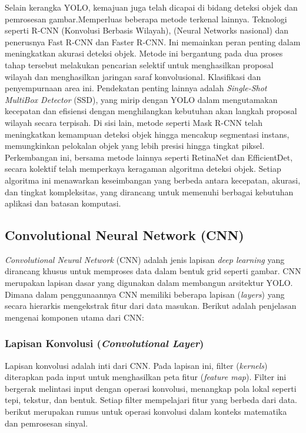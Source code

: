 Selain kerangka YOLO, kemajuan juga telah dicapai di bidang deteksi objek dan pemrosesan gambar.Memperluas beberapa metode terkenal lainnya. Teknologi seperti R-CNN (Konvolusi Berbasis Wilayah), (Neural Networks nasional) dan penerusnya Fast R-CNN dan Faster R-CNN.
Ini memainkan peran penting dalam meningkatkan akurasi deteksi objek. Metode ini bergantung pada dua proses tahap tersebut melakukan pencarian selektif untuk menghasilkan proposal wilayah dan menghasilkan jaringan saraf konvolusional. Klasifikasi dan penyempurnaan area ini. Pendekatan penting lainnya adalah \emph{Single-Shot MultiBox Detector} (SSD), yang mirip dengan YOLO dalam mengutamakan kecepatan dan efisiensi dengan menghilangkan kebutuhan akan langkah proposal wilayah secara terpisah. Di sisi lain, metode seperti Mask R-CNN telah meningkatkan kemampuan deteksi objek hingga mencakup segmentasi instans, memungkinkan pelokalan objek yang lebih presisi hingga tingkat piksel. Perkembangan ini, bersama metode lainnya seperti RetinaNet dan EfficientDet, secara kolektif telah memperkaya keragaman algoritma deteksi objek. Setiap algoritma ini menawarkan keseimbangan yang berbeda antara kecepatan, akurasi, dan tingkat kompleksitas, yang dirancang untuk memenuhi berbagai kebutuhan aplikasi dan batasan komputasi\cite{terven2023yolo}.

\subsection{Convolutional Neural Network (CNN)}
\emph{Convolutional Neural Network} (CNN) adalah jenis lapisan \emph{deep learning} yang dirancang khusus untuk memproses data dalam bentuk grid seperti gambar. CNN merupakan lapisan dasar yang digunakan dalam membangun arsitektur YOLO. Dimana dalam penggunaannya CNN memiliki beberapa lapisan (\emph{layers}) yang secara hierarkis mengekstrak fitur dari data masukan. Berikut adalah penjelasan mengenai komponen utama dari CNN:

\subsubsection{Lapisan Konvolusi (\emph{Convolutional Layer})}
Lapisan konvolusi adalah inti dari CNN. Pada lapisan ini, filter (\emph{kernels}) diterapkan pada input untuk menghasilkan peta fitur (\emph{feature map}). Filter ini bergerak melintasi input dengan operasi konvolusi, menangkap pola lokal seperti tepi, tekstur, dan bentuk. Setiap filter mempelajari fitur yang berbeda dari data. berikut merupakan rumus untuk operasi konvolusi dalam konteks matematika dan pemrosesan sinyal.


